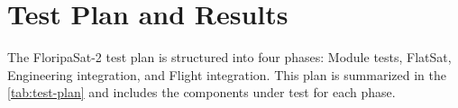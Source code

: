 %
%
%
%
%

%
%
%
%
%
%

\chapter{Test Plan and Results} \label{ch:test-plan}

The FloripaSat-2 test plan is structured into four phases: Module tests, FlatSat, Engineering integration, and Flight integration. This plan is summarized in the \autoref{tab:test-plan} and includes the components under test for each phase. 


